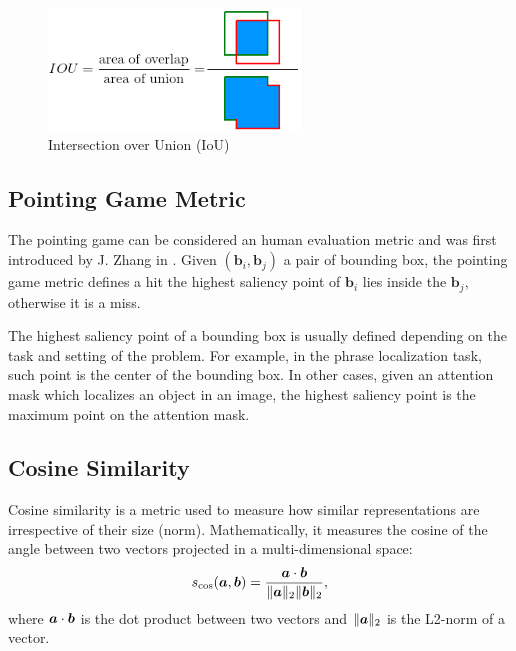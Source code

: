 \begin{figure}
  \centering
  \includegraphics[width=0.6\textwidth]{figures/iou.png}
  \caption[Intersection over Union (IoU)]{Intersection over Union (IoU) \cite{padilla2020survey}}
  \label{fig:iou}
\end{figure}

\subsection{Pointing Game Metric}
\label{subsec:pointing-game-metric}

The pointing game can be considered an human evaluation metric
\cite{petsiuk2018rise} and was first introduced by J. Zhang \etal{} in
\cite{zhang2018top}. Given $(\bm{b}_i , \bm{b}_j)$ a pair of bounding
box, the pointing game metric defines a hit the highest saliency point
of $\bm{b}_i$ lies inside the $\bm{b}_j$, otherwise it is a miss.

The highest saliency point of a bounding box is usually defined
depending on the task and setting of the problem. For example, in the
phrase localization task, such point is the center of the bounding
box. In other cases, given an attention mask which localizes an object
in an image, the highest saliency point is the maximum point on the
attention mask.

\subsection{Cosine Similarity}

Cosine similarity is a metric used to measure how similar
representations are irrespective of their size (norm). Mathematically,
it measures the cosine of the angle between two vectors projected in a
multi-dimensional space:
\begin{equation}
  s_{\cos}(\bm{a}, \bm{b}) = \frac{\bm{a} \cdot \bm{b}}{\| \bm{a} \|_2 \| \bm{b} \|_2},
\end{equation}
where $\bm{a} \cdot \bm{b}$ is the dot product between two vectors and
$\| \bm{a} \|_2$ is the L2-norm of a vector.
